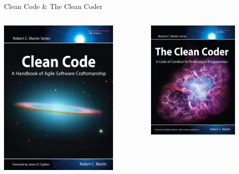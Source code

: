 \begin{frame}{Clean Code \& The Clean Coder}
\begin{columns}
	\begin{center}
	\includegraphics[width=0.8\textwidth]{resources/CleanCode.jpg}
	\end{center}
	\begin{center}
	\includegraphics[width=0.8\textwidth]{resources/TheCleanCoder.jpg}
	\end{center}
\end{columns}
\end{frame}

